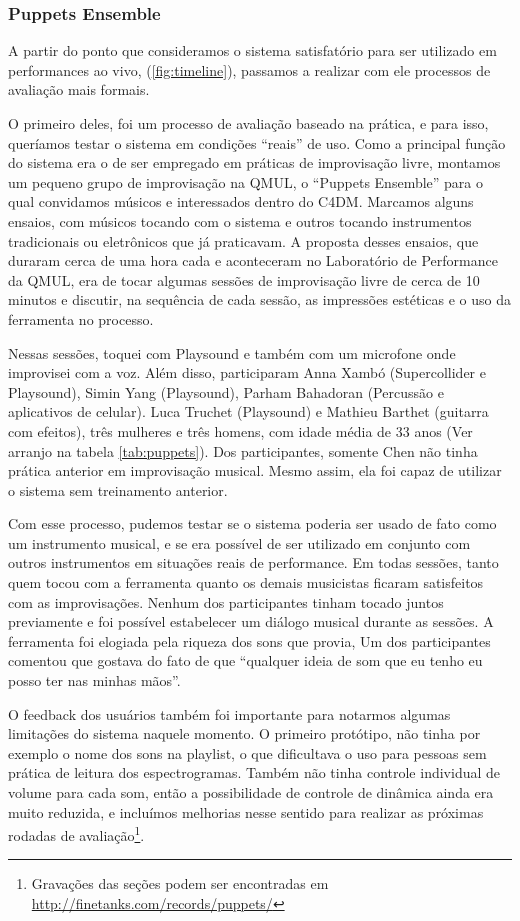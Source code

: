 \subsubsection{Puppets Ensemble}

A partir do ponto que consideramos o sistema satisfatório para ser utilizado em performances ao vivo, (\ref{fig:timeline}), passamos a realizar com ele processos de avaliação mais formais. 

O primeiro deles, foi um processo de avaliação baseado na prática, e para isso, queríamos testar o sistema em condições ``reais'' de uso. Como a principal função do sistema era o de ser empregado em práticas de improvisação livre, montamos um pequeno grupo de improvisação na QMUL, o ``Puppets Ensemble'' para o qual convidamos músicos e interessados dentro do C4DM. Marcamos alguns ensaios, com músicos tocando com o sistema e outros tocando instrumentos tradicionais ou eletrônicos que já praticavam. A proposta desses ensaios, que duraram cerca de uma hora cada e aconteceram no Laboratório de Performance da QMUL, era de tocar algumas sessões de improvisação livre de cerca de 10 minutos e discutir, na sequência de cada sessão, as impressões estéticas e o uso da ferramenta no processo.

Nessas sessões, toquei com Playsound e também com um microfone onde improvisei com a voz. Além disso, participaram Anna Xambó (Supercollider e Playsound), Simin Yang (Playsound), Parham Bahadoran (Percussão e aplicativos de celular). Luca Truchet (Playsound) e Mathieu Barthet (guitarra com efeitos), três mulheres e três homens, com idade média de 33 anos (Ver arranjo na tabela \ref{tab:puppets}). Dos participantes, somente Chen não tinha prática anterior em improvisação musical. Mesmo assim, ela foi capaz de utilizar o sistema sem treinamento anterior.

Com esse processo, pudemos testar se o sistema poderia ser usado de fato como um instrumento musical, e se era possível de ser utilizado em conjunto com outros instrumentos em situações reais de performance. Em todas sessões, tanto quem tocou com a ferramenta quanto os demais musicistas ficaram satisfeitos com as improvisações. Nenhum dos participantes tinham tocado juntos previamente e foi possível estabelecer um diálogo musical durante as sessões. A ferramenta foi elogiada pela riqueza dos sons que provia, Um dos participantes comentou que gostava do fato de que ``qualquer ideia de som que eu tenho eu posso ter nas minhas mãos''. 

O feedback dos usuários também foi importante para notarmos algumas limitações do sistema naquele momento. O primeiro protótipo, não tinha por exemplo o nome dos sons na playlist, o que dificultava o uso para pessoas sem prática de leitura dos espectrogramas. Também não tinha controle individual de volume para cada som, então a possibilidade de controle de dinâmica ainda era muito reduzida, e incluímos melhorias nesse sentido para realizar as próximas rodadas de avaliação\footnote{Gravações das seções podem ser encontradas em \url{http://finetanks.com/records/puppets/}}.

